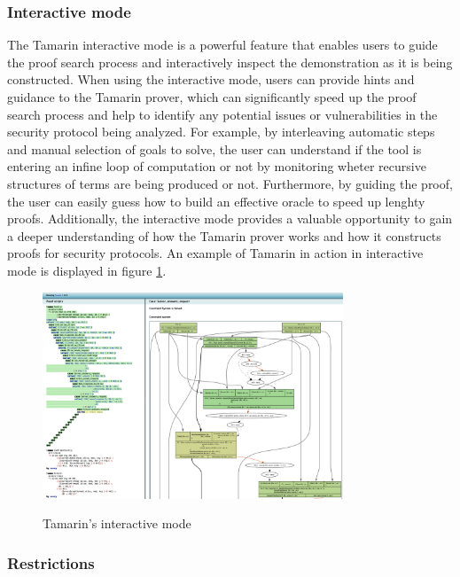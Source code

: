 \documentclass[fleqn,10pt]{SelfArx} %
\begin{document}
\subsubsection{Interactive mode}\label{subsec:tamarinGui}

The Tamarin interactive mode is a powerful feature that enables users to guide the proof search process and interactively inspect the demonstration as it is being constructed. When using the interactive mode, users can provide hints and guidance to the Tamarin prover, which can significantly speed up the proof search process and help to identify any potential issues or vulnerabilities in the security protocol being analyzed. For example, by interleaving automatic steps and manual selection of goals to solve, the user can understand if the tool is entering an infine loop of computation or not by monitoring wheter recursive structures of terms are being produced or not. Furthermore, by guiding the proof, the user can easily guess how to build an effective oracle to speed up lenghty proofs. Additionally, the interactive mode provides a valuable opportunity to gain a deeper understanding of how the Tamarin prover works and how it constructs proofs for security protocols. An example of Tamarin in action in interactive mode is displayed in figure \ref{fig:interactive}.

\begin{figure}
    \centering
    \captionsetup{justification=centering, margin=1cm}
    \includegraphics[width=0.8\textwidth]{Figures/gui.png}
    \label{fig:interactive}
    \caption{Tamarin's interactive mode}
\end{figure}

\subsubsection{Restrictions}
\end{document}
